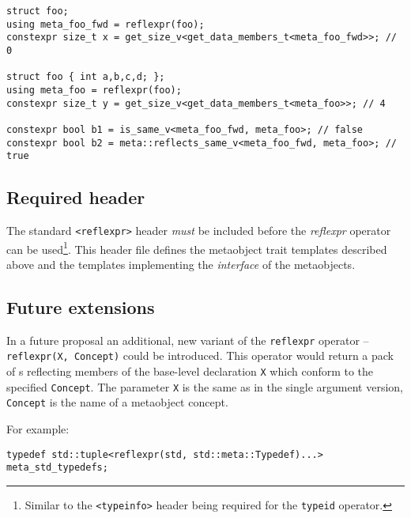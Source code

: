 \begin{verbatim}
struct foo;
using meta_foo_fwd = reflexpr(foo);
constexpr size_t x = get_size_v<get_data_members_t<meta_foo_fwd>>; // 0

struct foo { int a,b,c,d; };
using meta_foo = reflexpr(foo);
constexpr size_t y = get_size_v<get_data_members_t<meta_foo>>; // 4

constexpr bool b1 = is_same_v<meta_foo_fwd, meta_foo>; // false
constexpr bool b2 = meta::reflects_same_v<meta_foo_fwd, meta_foo>; // true
\end{verbatim}

\subsection{Required header}
\label{section-reflexpr-header}

The standard \texttt{<reflexpr>} header \emph{must} be included before
the \emph{reflexpr} operator can be used\footnote{Similar to the
\texttt{<typeinfo>} header being required for the \texttt{typeid} operator.}.
This header file defines the metaobject trait templates described above
and the templates implementing the \emph{interface} of the metaobjects.

\subsection{Future extensions}

In a future proposal an additional, new variant of the \texttt{reflexpr} operator
-- \texttt{reflexpr(X, Concept)} could be introduced.
This operator would return a pack of s reflecting members of
the base-level declaration \texttt{X} which conform to the specified
\texttt{Concept}. The parameter \texttt{X} is the same as in the single argument
version, \texttt{Concept} is the name of a metaobject concept.

For example:

\begin{verbatim}
typedef std::tuple<reflexpr(std, std::meta::Typedef)...> meta_std_typedefs;
\end{verbatim}
